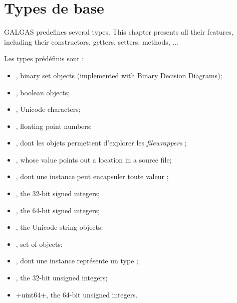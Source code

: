 
\chapter{Types de base}\label{predefinedTypes}

GALGAS predefines several types. This chapter presents all their features, including their constructors, getters, setters, methods, ...


Les types prédéfinis sont :
\begin{itemize}
\item {}, binary set objects (implemented with Binary Decision Diagrams);
\item {}, boolean objects;
\item {}, Unicode characters;
\item {}, floating point numbers;
\item {}, dont les objets permettent d'explorer les \emph{filewrappers} ;
\item {}, whose value points out a location in a source file;
\item {}, dont une instance peut encapsuler toute valeur ;
\item {}, the 32-bit signed integers;
\item {}, the 64-bit signed integers;
\item {}, the Unicode string objects;
\item {}, set of  objects;
\item {}, dont une instance représente un type ;
\item {}, the 32-bit unsigned integers;
\item \ggs+uint64+, the 64-bit unsigned integers.
\end{itemize}

